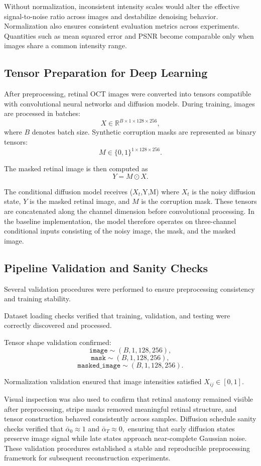 \documentclass[12pt,oneside]{article}
\newcommand{\R}{\mathbb{R}}
\begin{document}
Without normalization, inconsistent intensity scales would alter the effective signal-to-noise ratio across images and destabilize denoising behavior.
Normalization also ensures consistent evaluation metrics across experiments. Quantities such as mean squared error and PSNR become comparable only when images share a common intensity range.

\subsection*{Tensor Preparation for Deep Learning}

After preprocessing, retinal OCT images were converted into tensors compatible with convolutional neural networks and diffusion models.
During training, images are processed in batches:
\[
X
\in
\R^{B \times 1 \times 128 \times 256},
\]
where $B$ denotes batch size.
Synthetic corruption masks are represented as binary tensors:
\[
M
\in
\{0,1\}^{1 \times 128 \times 256}.
\]

The masked retinal image is then computed as
\[
Y = M \odot X.
\]

The conditional diffusion model receives (\(X_t\),Y,M) where $X_t$ is the noisy diffusion state, $Y$ is the masked retinal image, and $M$ is the corruption mask.
These tensors are concatenated along the channel dimension before convolutional processing. In the baseline implementation, the model therefore operates on three-channel conditional inputs consisting of the noisy image, the mask, and the masked image.

\subsection*{Pipeline Validation and Sanity Checks}

Several validation procedures were performed to ensure preprocessing consistency and training stability.

Dataset loading checks verified that training, validation, and testing were correctly discovered and processed.

Tensor shape validation confirmed:
\[
\texttt{image}
\sim
(B,1,128,256),
\]
\[
\texttt{mask}
\sim
(B,1,128,256),
\]
\[
\texttt{masked\_image}
\sim
(B,1,128,256).
\]

Normalization validation ensured that image intensities satisfied \(X_{ij} \in [0,1].\)

Visual inspection was also used to confirm that retinal anatomy remained visible after preprocessing, stripe masks removed meaningful retinal structure, and tensor construction behaved consistently across samples.
Diffusion schedule sanity checks verified that \(\bar{\alpha}_0 \approx 1\) and \(\bar{\alpha}_T \approx 0,\) ensuring that early diffusion states preserve image signal while late states approach near-complete Gaussian noise.
These validation procedures established a stable and reproducible preprocessing framework for subsequent reconstruction experiments.
\end{document}
